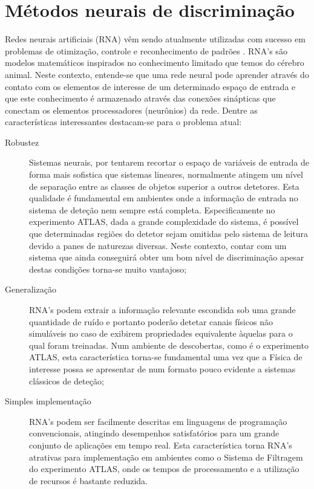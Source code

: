 \section{Métodos neurais de discriminação}
\label{sec:neural}

Redes neurais artificiais (RNA) vêm sendo atualmente utilizadas com sucesso em
problemas de otimização, controle e reconhecimento de padrões
\cite{haykin}. RNA's são modelos matemáticos inspirados no conhecimento
limitado que temos do cérebro animal. Neste contexto, entende-se que uma rede
neural pode aprender através do contato com os elementos de interesse de um
determinado espaço de entrada e que este conhecimento é armazenado através das
conexões sinápticas que conectam os elementos processadores (neurônios) da
rede. Dentre as características interessantes destacam-se para o problema
atual:

\begin{description}
\item[Robustez] Sistemas neurais, por tentarem recortar o espaço de variáveis
de entrada de forma mais sofistica que sistemas lineares, normalmente atingem
um nível de separação entre as classes de objetos superior a outros
detetores. Esta qualidade é fundamental em ambientes onde a informação de
entrada no sistema de deteção nem sempre está completa. Especificamente no
experimento ATLAS, dada a grande complexidade do sistema, é possível que
determinadas regiões do detetor sejam omitidas pelo sistema de leitura devido
a panes de naturezas diversas. Neste contexto, contar com um sistema que ainda
conseguirá obter um bom nível de discriminação apesar destas condições
torna-se muito vantajoso;

\item[Generalização] RNA's podem extrair a informação relevante escondida sob
uma grande quantidade de ruído e portanto poderão detetar canais físicos não
simuláveis no caso de exibirem propriedades equivalente àquelas para o qual
foram treinadas. Num ambiente de descobertas, como é o experimento ATLAS, esta
característica torna-se fundamental uma vez que a Física de interesse possa se
apresentar de num formato pouco evidente a sistemas clássicos de deteção;

\item[Simples implementação] RNA's podem ser facilmente descritas em
linguagens de programação convencionais, atingindo desempenhos satisfatórios
para um grande conjunto de aplicações em tempo real. Esta característica torna
RNA's atrativas para implementação em ambientes como o Sistema de Filtragem do
experimento ATLAS, onde os tempos de processamento e a utilização de recursos
é bastante reduzida.
\end{description}

